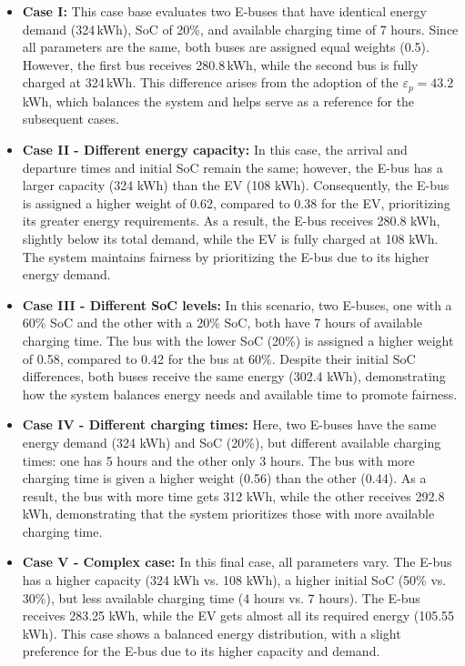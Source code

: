 \documentclass[preprint, 12pt, 3p]{elsarticle}
\begin{document}
\begin{itemize}
    \item \textbf{Case I:} This case base evaluates two E-buses that have identical energy demand \linebreak
    (324\,kWh), SoC of 20\%, 
    and available charging time of 7 hours. Since all parameters are the same, both buses are 
    assigned equal weights (0.5). However, the first bus receives 280.8\,kWh, while the 
    second bus is fully charged at 324\,kWh. This difference arises from the adoption of the 
    $\varepsilon_{p} = 43.2$ kWh, which balances the system and helps serve as a reference for the subsequent cases.

    \item \textbf{Case II - Different energy capacity:} In this case, the arrival and departure times 
    and initial SoC remain the same; however, the E-bus has a larger capacity (324 kWh) than the EV (108 kWh). Consequently, the E-bus is assigned a higher weight of 0.62, compared to 0.38 for the EV, prioritizing its greater energy requirements. As a result, the E-bus receives 280.8 kWh, slightly below its total demand, while the EV is fully charged at 108 kWh. The system maintains fairness by prioritizing the E-bus due to its higher energy demand.

    \item \textbf{Case III - Different SoC levels:} In this scenario, two E-buses, one with a 60\% SoC and the other with a 20\% SoC, both have 7 hours of available charging time. The bus with the lower SoC (20\%) is assigned a higher weight of 0.58, compared to 0.42 for the bus at 60\%. Despite their initial SoC differences, both buses receive the same energy (302.4 kWh), demonstrating how the system balances energy needs and available time to promote fairness.

    \item \textbf{Case IV - Different charging times:} Here, two E-buses have the same energy demand 
    (324 kWh) and SoC (20\%), but different available charging times: one has 5 hours 
    and the other only 3 hours. The bus with more charging time is given a higher 
    weight (0.56) than the other (0.44). As a result, the bus with more time gets 
    312 kWh, while the other receives 292.8 kWh, demonstrating that the system prioritizes 
    those with more available charging time.

    \item \textbf{Case V - Complex case:} In this final case, all parameters vary. 
    The E-bus has a higher capacity (324 kWh vs. 108 kWh), a higher initial 
    SoC (50\% vs. 30\%), but less available charging time (4 hours vs. 7 hours). 
    The E-bus receives 283.25 kWh, while the EV gets almost all its required energy 
    (105.55 kWh). This case shows a balanced energy distribution, with a slight 
    preference for the E-bus due to its higher capacity and demand.
\end{itemize}
\end{document}
